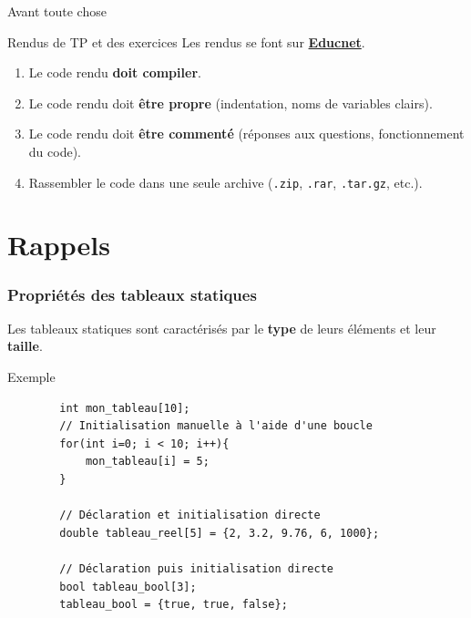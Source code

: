 
\subtitle{Les structures}
\date[5 oct. 2018]{Vendredi 5 octobre 2018}
\maketitle

\begin{frame}{Avant toute chose}
  \begin{alertblock}{Rendus de TP et des exercices}
  Les rendus se font sur \href{https://educnet.enpc.fr}{\textbf{Educnet}}.
  \begin{enumerate}
    \item Le code rendu \textbf{doit compiler}.
    \item Le code rendu doit \textbf{être propre} (indentation, noms de variables clairs).
    \item Le code rendu doit \textbf{être commenté} (réponses aux questions, fonctionnement du code).
    \item Rassembler le code dans une seule archive (\texttt{.zip}, \texttt{.rar}, \texttt{.tar.gz}, etc.).
  \end{enumerate}
  \end{alertblock}

\end{frame}

\section{Rappels}


\begin{frame}[fragile=singleslide]
    \frametitle{Propriétés des tableaux statiques}
    Les tableaux statiques sont caractérisés par le \textbf{type} de leurs éléments et leur \textbf{taille}.
	
    \begin{exampleblock}{Exemple}
    \begin{verbatim}
		int mon_tableau[10];
		// Initialisation manuelle à l'aide d'une boucle
		for(int i=0; i < 10; i++){
        	mon_tableau[i] = 5;
		}

		// Déclaration et initialisation directe
		double tableau_reel[5] = {2, 3.2, 9.76, 6, 1000};

		// Déclaration puis initialisation directe
		bool tableau_bool[3];
		tableau_bool = {true, true, false};
    \end{verbatim}
    \end{exampleblock}
\end{frame}

